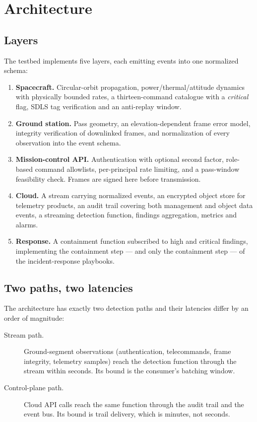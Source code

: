 \section{Architecture}

\subsection{Layers}

The testbed implements five layers, each emitting events into one normalized
schema:

\begin{enumerate}
\item \textbf{Spacecraft.} Circular-orbit propagation, power/thermal/attitude
dynamics with physically bounded rates, a thirteen-command catalogue with a
\emph{critical} flag, SDLS tag verification and an anti-replay window.
\item \textbf{Ground station.} Pass geometry, an elevation-dependent frame error
model, integrity verification of downlinked frames, and normalization of every
observation into the event schema.
\item \textbf{Mission-control API.} Authentication with optional second factor,
role-based command allowlists, per-principal rate limiting, and a pass-window
feasibility check. Frames are signed here before transmission.
\item \textbf{Cloud.} A stream carrying normalized events, an encrypted object
store for telemetry products, an audit trail covering both management and object
data events, a streaming detection function, findings aggregation, metrics and
alarms.
\item \textbf{Response.} A containment function subscribed to high and critical
findings, implementing the containment step --- and only the containment step ---
of the incident-response playbooks.
\end{enumerate}

\subsection{Two paths, two latencies}

The architecture has exactly two detection paths and their latencies differ by an
order of magnitude:

\begin{description}
\item[Stream path.] Ground-segment observations (authentication, telecommands,
frame integrity, telemetry samples) reach the detection function through the
stream within seconds. Its bound is the consumer's batching window.
\item[Control-plane path.] Cloud API calls reach the same function through the
audit trail and the event bus. Its bound is trail delivery, which is minutes, not
seconds.
\end{description}

